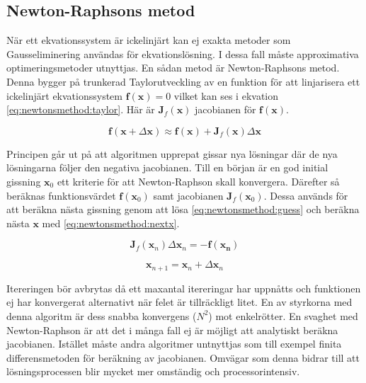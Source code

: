 \subsection{Newton-Raphsons metod}

När ett ekvationssystem är ickelinjärt kan ej exakta metoder som Gausseliminering användas
för ekvationslösning.
I dessa fall måste approximativa optimeringsmetoder utnyttjas. En sådan
metod är Newton-Raphsons metod. Denna bygger på trunkerad Taylorutveckling 
av en funktion för att linjarisera ett ickelinjärt ekvationssystem
$\mathbf{f}(\mathbf{x}) = 0$
vilket kan ses i ekvation \eqref{eq:newtonsmethod:taylor}. Här är
$\mathbf{J}_f(\mathbf{x})$ jacobianen för $\mathbf{f}(\mathbf{x})$. 

\begin{equation}
\label{eq:newtonsmethod:taylor}
\mathbf{f}(\mathbf{x} + \Delta\mathbf{x}) \approx \mathbf{f}(\mathbf{x}) +
\mathbf{J}_f(\mathbf{x})\Delta\mathbf{x}
\end{equation}

\noindent
Principen går ut på att algoritmen upprepat gissar nya lösningar där de
nya lösningarna följer den negativa jacobianen. Till en början är en god initial gissning
$\mathbf{x}_0$ ett kriterie för att Newton-Raphson skall konvergera. Därefter så beräknas
funktionsvärdet $\mathbf{f}(\mathbf{x}_0)$ samt jacobianen $\mathbf{J}_f(\mathbf{x}_0)$.
Dessa används för att beräkna nästa gissning genom att lösa
\eqref{eq:newtonsmethod:guess} och beräkna nästa $\mathbf{x}$ med
\eqref{eq:newtonsmethod:nextx}. \cite{heath2002}

\begin{equation}
\label{eq:newtonsmethod:guess}
\mathbf{J}_f(\mathbf{x}_n)\Delta\mathbf{x}_n = -\mathbf{f}(\mathbf{x_n})
\end{equation}

\begin{equation}
\label{eq:newtonsmethod:nextx}
\mathbf{x}_{n+1} = \mathbf{x}_n + \Delta\mathbf{x}_n
\end{equation}

\noindent
Itereringen bör avbrytas då ett maxantal itereringar har uppnåtts och funktionen
ej har konvergerat alternativt när felet är tillräckligt litet. En av styrkorna 
med denna algoritm är dess snabba konvergens ($N^2$) mot enkelrötter. \cite{ympa95}
En svaghet med Newton-Raphson är att det i många fall ej är möjligt att analytiskt beräkna
jacobianen. Istället måste andra algoritmer untnyttjas som till exempel finita differensmetoden
för beräkning av jacobianen. Omvägar som denna bidrar till att lösningsprocessen blir mycket
mer omständig och processorintensiv. 
